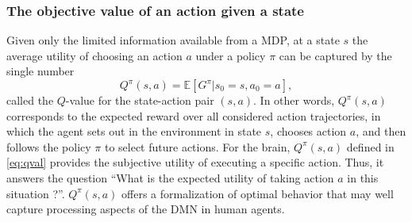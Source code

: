 \documentclass[10pt,letterpaper]{article}
\def\V{\mathbf{V}}
\begin{document}
\subsubsection{The objective value of an action given a state}
Given only the limited information available from a MDP, at a state $s$ the average
utility of choosing an action $a$ under a policy $\pi$ can be captured by the single number
\begin{equation}
  \label{eq:qval}
  Q^{\pi}(s,a) = \mathbb E [G^\pi|s_0=s,a_0=a],
\end{equation}
called the $Q$-value for the state-action pair $(s,a)$.
In other words, $Q^{\pi}(s,a)$ corresponds to the expected reward
over all considered action trajectories, in which
the agent sets out in the environment in state
$s$, chooses action $a$, and then follows the policy $\pi$ to select future actions.
For the brain,
$Q^{\pi}(s, a)$ defined in \eqref{eq:qval} provides the subjective
utility of executing a specific action.
Thus, it answers the question
``What is the expected utility of taking action $a$ in this situation ?''.
$Q^{\pi}(s,a)$ offers a formalization of optimal behavior that
may well capture processing aspects of the DMN in human agents.



\end{document}
